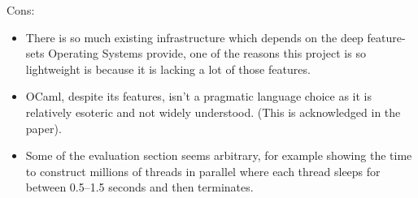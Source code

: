 \documentclass[11pt]{article}
\begin{document}
Cons:

\begin{itemize}





    \item There is so much existing infrastructure which depends on the deep
    feature-sets Operating Systems provide, one of the reasons this project is
    so lightweight is because it is lacking a lot of those features.

    \item OCaml, despite its features, isn't a pragmatic language choice as it
    is relatively esoteric and not widely understood. (This is acknowledged in
    the paper).


    \item Some of the evaluation section seems arbitrary, for example showing
    the time to construct millions of threads in parallel where each thread
    sleeps for between 0.5–1.5 seconds and then terminates.








\end{itemize}
\end{document}
